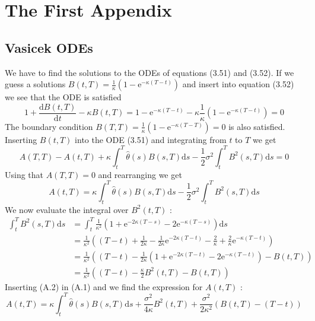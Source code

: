 \documentclass[12pt,twoside]{reedthesis}
\begin{document}
\appendix

\hypertarget{the-first-appendix}{%
\chapter{The First Appendix}\label{the-first-appendix}}

\hypertarget{vasicek-odes}{%
\section{Vasicek ODEs}\label{vasicek-odes}}

We have to find the solutions to the ODEs of equations (3.51) and (3.52). If we guess a solutions \(B(t, T)=\frac{1}{\kappa}\left(1-\mathrm{e}^{-\kappa(T-t)}\right)\) and insert into equation (3.52) we see that the ODE is satisfied
\[
1+\frac{\mathrm{d} B(t, T)}{\mathrm{d} t}-\kappa B(t, T)=1-\mathrm{e}^{-\kappa(T-t)}-\kappa \frac{1}{\kappa}\left(1-\mathrm{e}^{-\kappa(T-t)}\right)=0
\]
The boundary condition \(B(T, T)=\frac{1}{\kappa}\left(1-\mathrm{e}^{-\kappa(T-T)}\right)=0\) is also satisfied. Inserting \(B(t, T)\) into the ODE (3.51) and integrating from \(t\) to \(T\) we get
\[
A(T, T)-A(t, T)+\kappa \int_{t}^{T} \hat{\theta}(s) B(s, T) \mathrm{d} s-\frac{1}{2} \sigma^{2} \int_{t}^{T} B^{2}(s, T) \mathrm{d} s=0
\]
Using that \(A(T, T)=0\) and rearranging we get
\[
A(t, T)=\kappa \int_{t}^{T} \hat{\theta}(s) B(s, T) \mathrm{d} s-\frac{1}{2} \sigma^{2} \int_{t}^{T} B^{2}(s, T) \mathrm{d} s
\]
We now evaluate the integral over \(B^{2}(t, T)\) :
\[
\begin{aligned}
\int_{t}^{T} B^{2}(s, T) \mathrm{d} s &=\int_{t}^{T} \frac{1}{\kappa^{2}}\left(1+\mathrm{e}^{-2 \kappa(T-s)}-2 \mathrm{e}^{-\kappa(T-s)}\right) \mathrm{d} s \\
&=\frac{1}{\kappa^{2}}\left((T-t)+\frac{1}{2 \kappa}-\frac{1}{2 \kappa} \mathrm{e}^{-2 \kappa(T-t)}-\frac{2}{\kappa}+\frac{2}{\kappa} \mathrm{e}^{-\kappa(T-t)}\right) \\
&=\frac{1}{\kappa^{2}}\left((T-t)-\frac{1}{2 \kappa}\left(1+\mathrm{e}^{-2 \kappa(T-t)}-2 \mathrm{e}^{-\kappa(T-t)}\right)-B(t, T)\right) \\
&=\frac{1}{\kappa^{2}}\left((T-t)-\frac{\kappa}{2} B^{2}(t, T)-B(t, T)\right)
\end{aligned}
\]
Inserting (A.2) in (A.1) and we find the expression for \(A(t, T)\) :
\[
A(t, T)=\kappa \int_{t}^{T} \hat{\theta}(s) B(s, T) \mathrm{d} s+\frac{\sigma^{2}}{4 \kappa} B^{2}(t, T)+\frac{\sigma^{2}}{2 \kappa^{2}}(B(t, T)-(T-t))
\]
\end{document}
